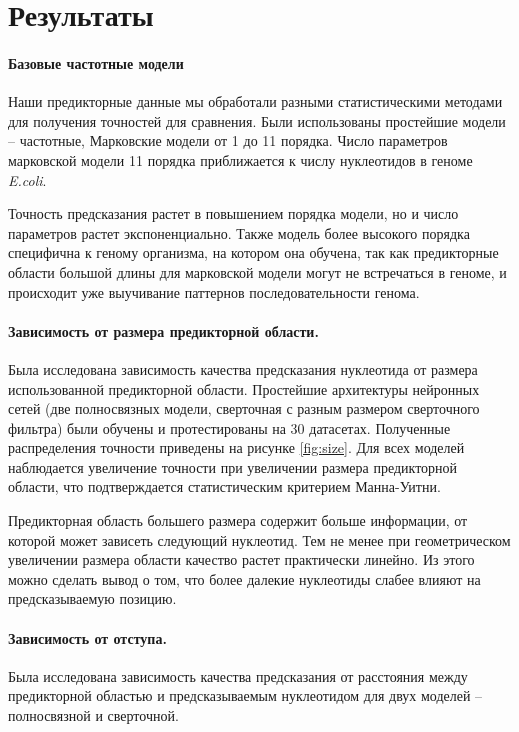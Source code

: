 \section{Результаты}
\newcommand{\mannwhitni}{{\scriptsize Значимость отличия выборок по критерию Манна-Уитни: ns $P>0.05$, * $P\leq 0.05$, ** $P\leq 0.01$, *** $P\leq 0.001$}}

\paragraph{Базовые частотные модели} Наши предикторные данные мы обработали разными статистическими методами для получения точностей для сравнения. Были использованы простейшие модели -- частотные, Марковские модели от 1 до 11 порядка. Число параметров марковской модели 11 порядка приближается к числу нуклеотидов в геноме \emph{E.coli}.

Точность предсказания растет в повышением порядка модели, но и число параметров растет экспоненциально. Также модель более высокого порядка специфична к геному организма, на котором она обучена, так как предикторные области большой длины для марковской модели могут не встречаться в геноме, и происходит уже выучивание паттернов последовательности генома.




\paragraph{Зависимость от размера предикторной области.} Была исследована зависимость качества предсказания нуклеотида от размера использованной предикторной области. Простейшие архитектуры нейронных сетей (две полносвязных модели, сверточная с разным размером сверточного фильтра) были обучены и протестированы на 30 датасетах. Полученные распределения точности приведены на рисунке \ref{fig:size}. Для всех моделей наблюдается увеличение точности при увеличении размера предикторной области, что подтверждается статистическим критерием Манна-Уитни.

Предикторная область большего размера содержит больше информации, от которой может зависеть следующий нуклеотид. Тем не менее при геометрическом увеличении размера области качество растет практически линейно. Из этого можно сделать вывод о том, что более далекие нуклеотиды слабее влияют на предсказываемую позицию.



\paragraph{Зависимость от отступа.} Была исследована зависимость качества предсказания от расстояния между предикторной областью и предсказываемым нуклеотидом для двух моделей -- полносвязной и сверточной. 

